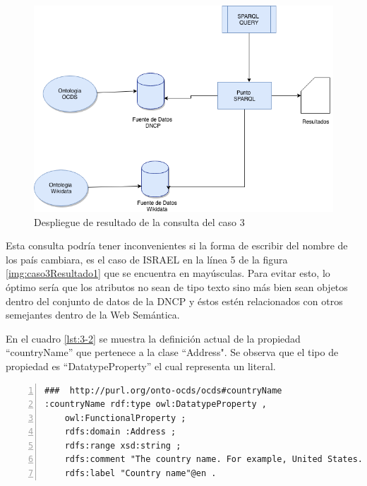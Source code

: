  \begin{figure}[ht!]
    \centering
    \includegraphics[width=150mm]{figuras/Diagramas-Caso3.png}
    \caption{Despliegue de resultado de la consulta del caso 3}
    \label{img:DiagramaCaso3}
 \end{figure}

 Esta consulta podría tener inconvenientes si la forma de escribir del nombre de los país cambiara, es el caso de ISRAEL en la línea 5 de la figura \ref{img:caso3Resultado1} que se encuentra en mayúsculas. Para evitar esto, lo óptimo sería que los atributos no sean de tipo texto sino más bien sean objetos dentro del conjunto de datos de la DNCP y éstos estén relacionados con otros semejantes dentro de la Web Semántica.

En el cuadro \ref{lst:3-2} se muestra la definición actual de la propiedad “countryName” que pertenece a la clase “Address". Se observa que el tipo de propiedad es “DatatypeProperty” el cual representa un literal.\hfill \break 

\noindent\begin{minipage}[c]{\textwidth}
\begin{lstlisting}[captionpos=b, caption=Definicion de la propiedad countryName, label={lst:3-2},  numbers=left,  numberstyle=\tiny\color{mygray},
    basicstyle=\footnotesize\ttfamily,frame=single]
###  http://purl.org/onto-ocds/ocds#countryName
:countryName rdf:type owl:DatatypeProperty ,
    owl:FunctionalProperty ;
    rdfs:domain :Address ;
    rdfs:range xsd:string ;
    rdfs:comment "The country name. For example, United States."@en ;
    rdfs:label "Country name"@en .
 \end{lstlisting}
\end{minipage}

